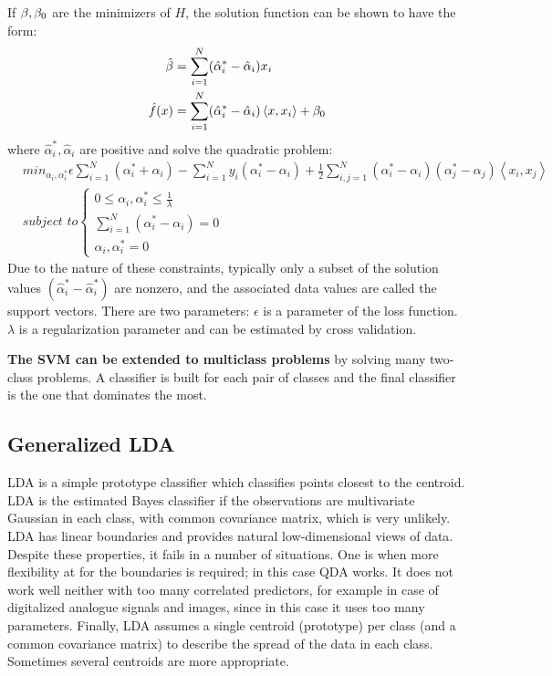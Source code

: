If $\mathbf{\beta}, \mathbf{\beta}_0$ are the minimizers of $H$, the solution function can be shown to have the form:
\begin{equation}
\begin{aligned}
\hat{\mathbf{\beta}} &= \sum_{i=1}^N(\hat{\alpha}_i^* - \hat{\alpha}_i)x_i\\
\hat{f}(x) &= \sum_{i=1}^N(\hat{\alpha}_i^* - \hat{\alpha}_i)\left\langle x,x_i\right\rangle+\mathbf{\beta}_0
\end{aligned}
\end{equation}
where $\hat{\alpha}_i^*, \hat{\alpha}_i$ are positive and solve the quadratic problem:
\begin{equation}
\begin{aligned}
&min_{\alpha_i, \alpha_i^*}\epsilon \sum_{i=1}^N(\alpha_i^* + \alpha_i)-\sum_{i=1}^Ny_i(\alpha_i^* - \alpha_i)+\frac{1}{2}\sum_{i,j=1}^N(\alpha_i^* - \alpha_i)(\alpha_j^* - \alpha_j)\left\langle x_i,x_j\right\rangle\\
&\textit{subject to} \left\{ \begin{array}{lll}
		0 \le \alpha_i, \alpha_i^* \le \frac{1}{\lambda}\\
		\sum_{i=1}^N  (\alpha_i^* - \alpha_i) =0\\
		\alpha_i, \alpha_i^* = 0
		\end{array}
		\right.
\end{aligned}
\end{equation}
Due to the nature of these constraints, typically only a subset of the solution values $(\hat{\alpha}_i^* - \hat{\alpha}_i^*)$ are nonzero, and the associated data values are called the support vectors.
There are two parameters: $\epsilon$ is a parameter of the loss function. $\lambda$ is a regularization parameter and can be estimated by cross validation.

\textbf{The SVM can be extended to multiclass problems} by solving many two-class problems. A classifier is built for each pair of classes and the final classifier is the one that dominates the most.

\subsection{Generalized  LDA}
LDA is a simple prototype classifier which classifies points closest to the centroid. LDA is the estimated Bayes classifier if the observations are multivariate Gaussian in each class, with common covariance matrix, which is very unlikely. LDA has linear boundaries and provides natural low-dimensional views of data. Despite these properties, it fails in a number of situations. One is when more flexibility at for the boundaries is required; in this case QDA works. It does not work well neither with too many correlated predictors, for example in case of digitalized analogue signals and images, since in this case it uses too many parameters. Finally, LDA assumes a single centroid (prototype) per class (and a common covariance matrix) to describe the spread of the data in each class. Sometimes  several centroids are more appropriate.

